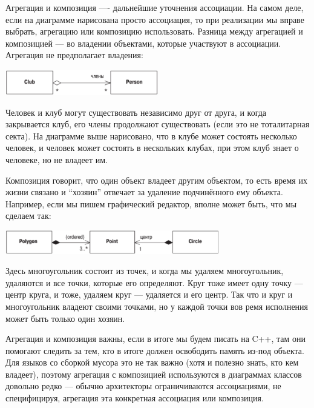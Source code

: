 \documentclass[a5paper]{article}
\begin{document}
Агрегация и композиция ---- дальнейшие уточнения ассоциации. На самом деле, если на диаграмме нарисована просто ассоциация, то при реализации мы вправе выбрать, агрегацию или композицию использовать. Разница между агрегацией и композицией --- во владении объектами, которые участвуют в ассоциации. Агрегация не предполагает владения:

\begin{center}
	\includegraphics[width=0.5\textwidth]{aggregation.png}
\end{center}

Человек и клуб могут существовать независимо друг от друга, и когда закрывается клуб, его члены продолжают существовать (если это не тоталитарная секта). На диаграмме выше нарисовано, что в клубе может состоять несколько человек, и человек может состоять в нескольких клубах, при этом клуб знает о человеке, но не владеет им.

Композиция говорит, что один объект владеет другим объектом, то есть время их жизни связано и ``хозяин'' отвечает за удаление подчинённого ему объекта. Например, если мы пишем графический редактор, вполне может быть, что мы сделаем так:

\begin{center}
	\includegraphics[width=0.7\textwidth]{composition.png}
\end{center}

Здесь многоугольник состоит из точек, и когда мы удаляем многоугольник, удаляются и все точки, которые его определяют. Круг тоже имеет одну точку --- центр круга, и тоже, удаляем круг --- удаляется и его центр. Так что и круг и многоугольник владеют своими точками, но у каждой точки вов ремя исполнения может быть только один хозяин.

Агрегация и композиция важны, если в итоге мы будем писать на C++, там они помогают следить за тем, кто в итоге должен освободить память из-под объекта. Для языков со сборкой мусора это не так важно (хотя и полезно знать, кто кем владеет), поэтому агрегация с композицией используются в диаграммах классов довольно редко --- обычно архитекторы ограничиваются ассоциациями, не специфицируя, агрегация эта конкретная ассоциация или композиция.
\end{document}
